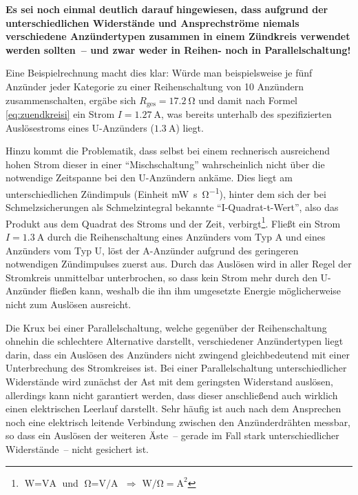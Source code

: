 \documentclass[paper=a4, parskip, numbers=noenddot, toc=listof, headsepline]{scrbook}
\begin{document}
					\textbf{Es sei noch einmal deutlich darauf hingewiesen, dass aufgrund der unterschiedlichen Widerstände und Ansprechströme niemals verschiedene Anzündertypen zusammen in einem Zündkreis verwendet werden sollten~-- und zwar weder in Reihen- noch in Parallelschaltung!}

					Eine Beispielrechnung macht dies klar: Würde man beispielsweise je fünf Anzünder jeder Kategorie zu einer Reihenschaltung von 10 Anzündern zusammenschalten, ergäbe sich $R_\text{ges} = \SI{17,2}{\ohm}$ und damit nach Formel \eqref{eq:zuendkreisi} ein Strom $I = \SI{1,27}{\ampere}$, was bereits unterhalb des spezifizierten Auslösestroms eines U-Anzünders ($\SI{1,3}{\ampere}$) liegt.

					Hinzu kommt die Problematik, dass selbst bei einem rechnerisch ausreichend hohen Strom dieser in einer \enquote{Mischschaltung} wahrscheinlich nicht über die notwendige Zeitspanne bei den U-Anzündern ankäme. Dies liegt am unterschiedlichen Zündimpuls (Einheit \si{\milli\watt\second\per\ohm}), hinter dem sich der bei Schmelzsicherungen als Schmelzintegral bekannte \enquote{I-Quadrat-t-Wert}, also das Produkt aus dem Quadrat des Stroms und der Zeit, verbirgt\footnote{$\si{\watt} = \si{\volt\ampere}$ und $\si{\ohm} = \si{\volt\per\ampere}$ $\Rightarrow$ $\si{\watt\per\ohm} = \si{\square\ampere}$}. Fließt ein Strom $I = \SI{1,3}{\ampere}$ durch die Reihenschaltung eines Anzünders vom Typ A und eines Anzünders vom Typ U, löst der A-Anzünder aufgrund des geringeren notwendigen Zündimpulses zuerst aus. Durch das Auslösen wird in aller Regel der Stromkreis unmittelbar unterbrochen, so dass kein Strom mehr durch den U-Anzünder fließen kann, weshalb die ihn ihm umgesetzte Energie möglicherweise nicht zum Auslösen ausreicht.

					Die Krux bei einer Parallelschaltung, welche gegenüber der Reihenschaltung ohnehin die schlechtere Alternative darstellt, verschiedener Anzündertypen liegt darin, dass ein Auslösen des Anzünders nicht zwingend gleichbedeutend mit einer Unterbrechung des Stromkreises ist. Bei einer Parallelschaltung unterschiedlicher Widerstände wird zunächst der Ast mit dem geringsten Widerstand auslösen, allerdings kann nicht garantiert werden, dass dieser anschließend auch wirklich einen elektrischen Leerlauf darstellt. Sehr häufig ist auch nach dem Ansprechen noch eine elektrisch leitende Verbindung zwischen den Anzünderdrähten messbar, so dass ein Auslösen der weiteren Äste~-- gerade im Fall stark unterschiedlicher Widerstände~-- nicht gesichert ist.
\end{document}
